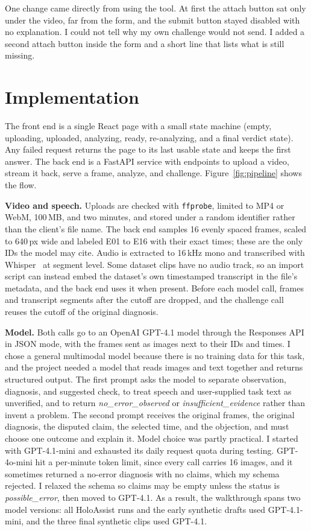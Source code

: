 \documentclass[sigconf]{acmart}
\begin{document}
One change came directly from using the tool. At first the attach button sat only under the video, far from the form, and the submit button stayed disabled with no explanation. I could not tell why my own challenge would not send. I added a second attach button inside the form and a short line that lists what is still missing.

\section{Implementation}

The front end is a single React page with a small state machine (empty, uploading, uploaded, analyzing, ready, re-analyzing, and a final verdict state). Any failed request returns the page to its last usable state and keeps the first answer. The back end is a FastAPI service with endpoints to upload a video, stream it back, serve a frame, analyze, and challenge. Figure~\ref{fig:pipeline} shows the flow.

\textbf{Video and speech.} Uploads are checked with \texttt{ffprobe}, limited to MP4 or WebM, 100\,MB, and two minutes, and stored under a random identifier rather than the client's file name. The back end samples 16 evenly spaced frames, scaled to 640\,px wide and labeled E01 to E16 with their exact times; these are the only IDs the model may cite. Audio is extracted to 16\,kHz mono and transcribed with Whisper~\cite{radford2023whisper} at segment level. Some dataset clips have no audio track, so an import script can instead embed the dataset's own timestamped transcript in the file's metadata, and the back end uses it when present. Before each model call, frames and transcript segments after the cutoff are dropped, and the challenge call reuses the cutoff of the original diagnosis.

\textbf{Model.} Both calls go to an OpenAI GPT-4.1 model through the Responses API in JSON mode, with the frames sent as images next to their IDs and times. I chose a general multimodal model because there is no training data for this task, and the project needed a model that reads images and text together and returns structured output. The first prompt asks the model to separate observation, diagnosis, and suggested check, to treat speech and user-supplied task text as unverified, and to return \emph{no\_error\_observed} or \emph{insufficient\_evidence} rather than invent a problem. The second prompt receives the original frames, the original diagnosis, the disputed claim, the selected time, and the objection, and must choose one outcome and explain it. Model choice was partly practical. I started with GPT-4.1-mini and exhausted its daily request quota during testing. GPT-4o-mini hit a per-minute token limit, since every call carries 16 images, and it sometimes returned a no-error diagnosis with no claims, which my schema rejected. I relaxed the schema so claims may be empty unless the status is \emph{possible\_error}, then moved to GPT-4.1. As a result, the walkthrough spans two model versions: all HoloAssist runs and the early synthetic drafts used GPT-4.1-mini, and the three final synthetic clips used GPT-4.1.
\end{document}
